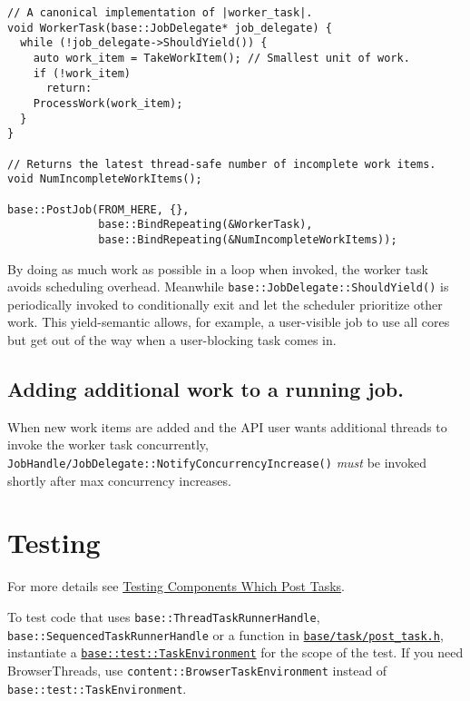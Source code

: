 \documentclass[a4paper,12pt,notitlepage,twoside,openright]{article}
\begin{document}
\begin{verbatim}
// A canonical implementation of |worker_task|.
void WorkerTask(base::JobDelegate* job_delegate) {
  while (!job_delegate->ShouldYield()) {
    auto work_item = TakeWorkItem(); // Smallest unit of work.
    if (!work_item)
      return:
    ProcessWork(work_item);
  }
}

// Returns the latest thread-safe number of incomplete work items.
void NumIncompleteWorkItems();

base::PostJob(FROM_HERE, {},
              base::BindRepeating(&WorkerTask),
              base::BindRepeating(&NumIncompleteWorkItems));
\end{verbatim}

By doing as much work as possible in a loop when invoked, the worker
task avoids scheduling overhead. Meanwhile
\texttt{base::JobDelegate::ShouldYield()} is periodically invoked to
conditionally exit and let the scheduler prioritize other work. This
yield-semantic allows, for example, a user-visible job to use all cores
but get out of the way when a user-blocking task comes in.

\hypertarget{adding-additional-work-to-a-running-job.}{%
\subsection{Adding additional work to a running
job.}\label{adding-additional-work-to-a-running-job.}}

When new work items are added and the API user wants additional threads
to invoke the worker task concurrently,
\texttt{JobHandle/JobDelegate::NotifyConcurrencyIncrease()} \emph{must}
be invoked shortly after max concurrency increases.

\hypertarget{testing}{%
\section{Testing}\label{testing}}

For more details see \href{threading_and_tasks_testing.md}{Testing
Components Which Post Tasks}.

To test code that uses \texttt{base::ThreadTaskRunnerHandle},
\texttt{base::SequencedTaskRunnerHandle} or a function in
\href{https://cs.chromium.org/chromium/src/base/task/post_task.h}{\texttt{base/task/post\_task.h}},
instantiate a
\href{https://cs.chromium.org/chromium/src/base/test/task_environment.h}{\texttt{base::test::TaskEnvironment}}
for the scope of the test. If you need BrowserThreads, use
\texttt{content::BrowserTaskEnvironment} instead of
\texttt{base::test::TaskEnvironment}.
\end{document}
